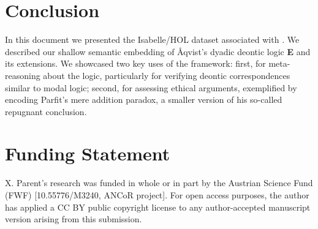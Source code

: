 \documentclass[11pt,a4paper]{article}
\begin{document}
\section{Conclusion}

In this document we presented the Isabelle/HOL dataset associated with
\cite{J68}. We described our shallow semantic embedding of \AA qvist's dyadic deontic logic  {\bf E} and its extensions. We showcased two key uses of the framework: first, for meta-reasoning about the logic, particularly for verifying deontic correspondences similar to modal logic; second, for assessing ethical arguments, exemplified by encoding Parfit's mere addition paradox, a smaller version of his so-called repugnant conclusion.


\section*{Funding Statement} X. Parent's research was funded in whole or in part by the Austrian Science Fund (FWF) [10.55776/M3240, ANCoR project]. For open access purposes, the author has applied a CC BY public copyright license to any author-accepted manuscript version arising from this submission.



\end{document}
